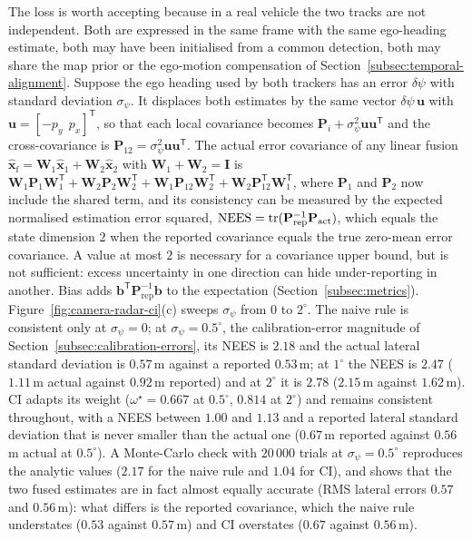 \begin{example}
The loss is worth accepting because in a real vehicle the two tracks are not independent. Both are expressed in the same frame with the same ego-heading estimate, both may have been initialised from a common detection, both may share the map prior or the ego-motion compensation of Section~\ref{subsec:temporal-alignment}. Suppose the ego heading used by both trackers has an error $\delta\psi$ with standard deviation $\sigma_{\psi}$. It displaces both estimates by the same vector $\delta\psi\,\mathbf{u}$ with $\mathbf{u}=[-p_{y}\ \ p_{x}]^{\mathsf T}$, so that each local covariance becomes $\mathbf{P}_{i}+\sigma_{\psi}^{2}\mathbf{u}\mathbf{u}^{\mathsf T}$ and the cross-covariance is $\mathbf{P}_{12}=\sigma_{\psi}^{2}\mathbf{u}\mathbf{u}^{\mathsf T}$. The actual error covariance of any linear fusion $\widehat{\mathbf{x}}_{\mathrm{f}}=\mathbf{W}_{1}\widehat{\mathbf{x}}_{1}+\mathbf{W}_{2}\widehat{\mathbf{x}}_{2}$ with $\mathbf{W}_{1}+\mathbf{W}_{2}=\mathbf{I}$ is $\mathbf{W}_{1}\mathbf{P}_{1}\mathbf{W}_{1}^{\mathsf T}+\mathbf{W}_{2}\mathbf{P}_{2}\mathbf{W}_{2}^{\mathsf T}+\mathbf{W}_{1}\mathbf{P}_{12}\mathbf{W}_{2}^{\mathsf T}+\mathbf{W}_{2}\mathbf{P}_{12}^{\mathsf T}\mathbf{W}_{1}^{\mathsf T}$, where $\mathbf{P}_{1}$ and $\mathbf{P}_{2}$ now include the shared term, and its consistency can be measured by the expected normalised estimation error squared, $\mathrm{NEES}=\operatorname{tr}(\mathbf{P}_{\mathrm{rep}}^{-1}\mathbf{P}_{\mathrm{act}})$, which equals the state dimension $2$ when the reported covariance equals the true zero-mean error covariance. A value at most $2$ is necessary for a covariance upper bound, but is not sufficient: excess uncertainty in one direction can hide under-reporting in another. Bias adds $\mathbf{b}^{\mathsf T}\mathbf{P}_{\mathrm{rep}}^{-1}\mathbf{b}$ to the expectation (Section~\ref{subsec:metrics}). Figure~\ref{fig:camera-radar-ci}(c) sweeps $\sigma_{\psi}$ from $0$ to $2^{\circ}$. The naive rule is consistent only at $\sigma_{\psi}=0$; at $\sigma_{\psi}=0.5^{\circ}$, the calibration-error magnitude of Section~\ref{subsec:calibration-errors}, its NEES is $2.18$ and the actual lateral standard deviation is $0.57$\,m against a reported $0.53$\,m; at $1^{\circ}$ the NEES is $2.47$ ($1.11$\,m actual against $0.92$\,m reported) and at $2^{\circ}$ it is $2.78$ ($2.15$\,m against $1.62$\,m). CI adapts its weight ($\omega^{\star}=0.667$ at $0.5^{\circ}$, $0.814$ at $2^{\circ}$) and remains consistent throughout, with a NEES between $1.00$ and $1.13$ and a reported lateral standard deviation that is never smaller than the actual one ($0.67$\,m reported against $0.56$\,m actual at $0.5^{\circ}$). A Monte-Carlo check with $20\,000$ trials at $\sigma_{\psi}=0.5^{\circ}$ reproduces the analytic values ($2.17$ for the naive rule and $1.04$ for CI), and shows that the two fused estimates are in fact almost equally accurate (RMS lateral errors $0.57$ and $0.56$\,m): what differs is the reported covariance, which the naive rule understates ($0.53$ against $0.57$\,m) and CI overstates ($0.67$ against $0.56$\,m).


\end{example}
